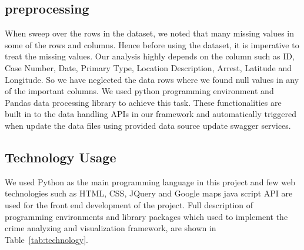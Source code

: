 \subsection{preprocessing}
When sweep over the rows in the dataset, we noted that many missing
values in some of the rows and columns. Hence before using the
dataset, it is imperative to treat the missing values. Our analysis
highly depends on the column such as ID, Case Number, Date, Primary
Type, Location Description, Arrest, Latitude and Longitude. So we have
neglected the data rows where we found null values in any of the
important columns. We used python programming environment and Pandas
data processing library to achieve this task. These functionalities
are built in to the data handling APIs in our framework and
automatically triggered when update the data files using provided data
source update swagger services.

\subsection{Technology Usage}
We used Python as the main programming language in this project and
few web technologies such as HTML, CSS, JQuery and Google maps java
script API are used for the front end development of the project. Full
description of programming environments and library packages which
used to implement the crime analyzing and visualization framework, are
shown in Table~\ref{tab:technology}.


